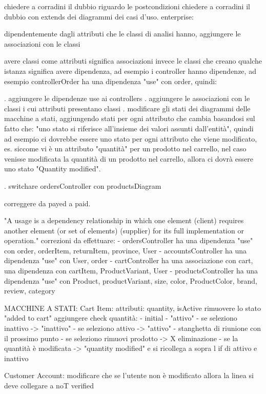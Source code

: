 chiedere a corradini il dubbio riguardo le postcondizioni
chiedere a corradini il dubbio con extends dei diagrammi dei casi d'uso.
enterprise:

dipendentemente dagli attributi che le classi di analisi hanno, aggiungere le associazioni con le classi

avere classi come attributi significa associazioni invece le classi che creano qualche istanza significa avere dipendenza, ad esempio i controller hanno dipendenze, ad esempio controllerOrder ha una dipendenza "use" con order, quindi:

. aggiungere le dipendenze use ai controllers
. aggiungere le associazioni con le classi i cui attributi presentano classi
. modificare gli stati dei diagrammi delle macchine a stati, aggiungendo stati per ogni attributo che cambia basandosi sul fatto che: "uno stato si riferisce all'insieme dei valori assunti dall'entità", quindi ad esempio ci dovrebbe essere uno stato per ogni attributo che viene modificato, es. siccome vi è un attributo "quantità" per un prodotto nel carrello, nel caso venisse modificata la quantità di un prodotto nel carrello, allora ci dovrà essere uno stato "Quantity modified".

. switchare ordersController con productsDiagram 


correggere da payed a paid.

"A usage is a dependency relationship in which one element (client) requires another element (or set of elements) (supplier) for its full implementation or operation."
correzioni da effettuare:
- ordersController ha una dipendenza "use" con order, orderItem, returnItem, province, User
- accountsController ha una dipendenza "use" con User, order
- cartController ha una associazione con cart, una dipendenza con cartItem, ProductVariant, User
- productsController ha una dipendenza "use" con Product, productVariant, size, color, ProductColor, brand, review, category


MACCHINE A STATI:
Cart Item: attributi: quantity, isActive
rimuovere lo stato "added to cart"
aggiungere check quantità:
 - initial
 - "attivo" 
    - se seleziono inattivo -> "inattivo"
        - se seleziono attivo -> "attivo"
    - stanghetta di riunione con il prossimo punto
 - se seleziono rimuovi prodotto -> X eliminazione
 - se la quantità è modificata -> "quantity modified" e si ricollega a sopra l if di attivo e inattivo

Customer Account: 
modificare che se l'utente non è modificato allora la linea si deve collegare a noT verified

